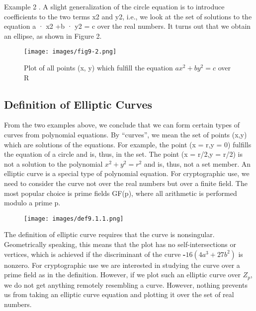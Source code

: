\documentclass{article}
\begin{document}
Example 2 . A slight generalization of the circle equation is to introduce coefficients
to the two terms x2 and y2, i.e., we look at the set of solutions to the equation
a · x2 +b · y2 = c over the real numbers. It turns out that we obtain an ellipse, as shown in Figure 2.

\begin{figure}[h]
	\begin{center}
  		\texttt{[image: images/fig9-2.png]}
  		\caption{Plot of all points (x, y) which fulfill the equation ${ax^2 + b y^2 = c }$ over R }
 	\end{center}
\end{figure}
\subsection{Definition of Elliptic Curves}

From the two examples above, we conclude that we can form certain types of curves
from polynomial equations. By “curves”, we mean the set of points (x,y) which are solutions of the equations. For example, the point (x = r,y = 0) fulfills the equation
of a circle and is, thus, in the set. The point (x = r/2,y = r/2) is not a solution to the
polynomial ${x^2+y^2 = r^2}$ and is, thus, not a set member. An elliptic curve is a special
type of polynomial equation. For cryptographic use, we need to consider the curve
not over the real numbers but over a finite field. The most popular choice is prime
fields GF(p), where all arithmetic is performed modulo a prime p.

 
\begin{figure}[h]
	\begin{center}
  		\texttt{[image: images/def9.1.1.png]}
 	\end{center}
\end{figure}

The definition of elliptic curve requires that the curve is nonsingular. Geometrically
speaking, this means that the plot has no self-intersections or vertices, which
is achieved if the discriminant of the curve \textbf{-}${16(4a^3+27b^2)}$ is nonzero.
For cryptographic use we are interested in studying the curve over a prime field
as in the definition. However, if we plot such an elliptic curve over ${Z_p}$, we do not get
anything remotely resembling a curve. However, nothing prevents us from taking an
elliptic curve equation and plotting it over the set of real numbers.
\end{document}
